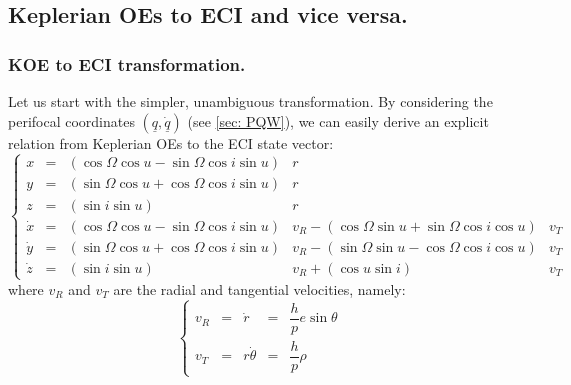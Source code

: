 	\subsection{Keplerian OEs to ECI and vice versa.}
		\subsubsection{KOE to ECI transformation.}
		\indent Let us start with the simpler, unambiguous transformation. By considering the perifocal coordinates $\left(\underline{q}, \dot{\underline{q}}\right) $ (see \ref{sec: PQW}), we can easily derive an explicit relation from Keplerian OEs to the ECI state vector:
		\[\left\{ \begin{array}{cclcc}
		x 		& = &\left(\cos\Omega \cos u - \sin \Omega \cos i \sin u\right)		& r &\\
		y 		& = & \left(\sin\Omega \cos u + \cos \Omega \cos i \sin u\right) 	& r &\\
		z 		& = & \left(\sin i \sin u\right) 									& r &\\
		\dot{x} & = & \left(\cos\Omega \cos u - \sin \Omega \cos i \sin u\right) 	& v_R  - \left(\cos\Omega \sin u + \sin \Omega \cos i \cos u\right) & v_T \\
		\dot{y} & = & \left(\sin\Omega \cos u + \cos \Omega \cos i \sin u\right)	& v_R  - \left(\sin\Omega \sin u - \cos \Omega \cos i \cos u\right) & v_T \\
		\dot{z} & = & \left(\sin i \sin u \right) 									& v_R + \left(\cos u \sin i \right) 								& v_T
		\end{array}\right.
		\]
		\noindent where $v_R$ and $v_T$ are the radial and tangential velocities, namely:
		\[
		\left\{ \begin{array}{lllll}
		v_R & = & \dot{r} & = & \dfrac{h}{p} e \sin \theta \\[1.5em]
		v_T & = &  r \dot{\theta} & = & \dfrac{h}{p} \rho
		\end{array}\right.
		\]
